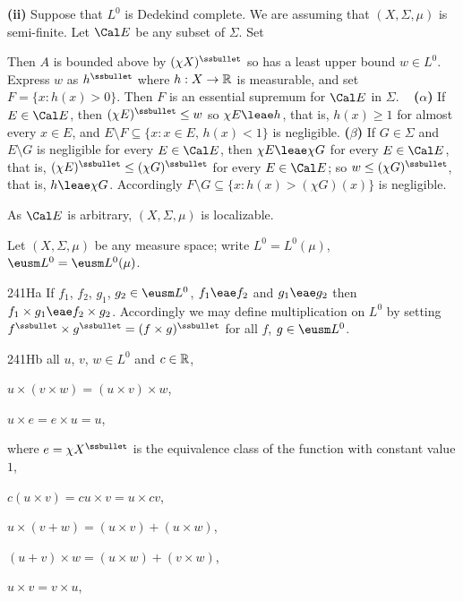 {\medskip

{\bf (ii)} Suppose that $L^0$ is Dedekind complete.   We are assuming
that $(X,\Sigma,\mu)$ is
semi-finite.   Let $\Cal E$ be any subset of $\Sigma$.   Set


\noindent Then $A$ is bounded above by $(\chi X)^{\ssbullet}$ so has a
least upper bound $w\in L^0$.   Express $w$ as $h^{\ssbullet}$ where
$h:X\to\Bbb R$ is measurable, and set $F=\{x:h(x)>0\}$.   Then $F$ is an
essential supremum for $\Cal E$ in $\Sigma$.   \Prf\ {\bf
(${\alpha}$)} If $E\in\Cal E$, then $(\chi E)^{\ssbullet}\le w$ so
$\chi E\leae h$, that is, $h(x)\ge 1$ for almost every $x\in E$, and
$E\setminus F\subseteq\{x:x\in E,\,h(x)<1\}$ is negligible.
{\bf (${\beta}$)} If $G\in\Sigma$ and $E\setminus G$ is negligible
for every $E\in\Cal E$, then $\chi E\leae\chi G$ for every
$E\in\Cal E$, that is, $(\chi E)^{\ssbullet}\le(\chi G)^{\ssbullet}$ for
every
$E\in\Cal E$;  so $w\le(\chi G)^{\ssbullet}$, that is, $h\leae\chi G$.
Accordingly $F\setminus G\subseteq\{x:h(x)>(\chi G)(x)\}$ is
negligible.\ \Qed

As $\Cal E$ is arbitrary, $(X,\Sigma,\mu)$ is localizable.
}%

  Let
$(X,\Sigma,\mu)$ be any measure space;  write $L^0=L^0(\mu)$,
$\eusm L^0=\eusm L^0(\mu)$.

\spheader 241Ha If $f_1$, $f_2$, $g_1$, $g_2\in\eusm L^0$,
$f_1\eae f_2$ and
$g_1\eae g_2$ then $f_1\times g_1\eae f_2\times g_2$.   Accordingly we
may define multiplication on $L^0$ by setting
$f^{\ssbullet}\times g^{\ssbullet}=(f\times g)^{\ssbullet}$ for all $f$,
$g\in\eusm L^0$.

\spheader 241Hb all $u$, $v$, $w\in L^0$ and $c\in\Bbb R$,

\qquad $u\times(v\times w)=(u\times v)\times w$,

\qquad $u\times e=e\times u=u$,

\noindent where $e=\chi X^{\ssbullet}$ is the
equivalence class of the function with constant value $1$,

\qquad $c(u\times v)=cu\times v=u\times cv$,

\qquad $u\times(v+w)=(u\times v)+(u\times w)$,

\qquad $(u+v)\times w=(u\times w)+(v\times w)$,

\qquad $u\times v=v\times u$,


